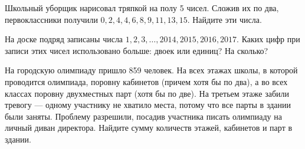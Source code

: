 ﻿
\begin{enumerate}

\itA Школьный уборщик нарисовал тряпкой на полу 5 чисел. Сложив их по два, первоклассники получили $0, 2, 4, 4, 6, 8, 9, 11, 13, 15$. Найдите эти числа.

\itB На доске подряд записаны числа $1,2,3,\dots, 2014, 2015, 2016, 2017.$ Каких цифр при записи этих чисел использовано больше: двоек или единиц? На сколько?

\itC На городскую олимпиаду пришло 859 человек. На всех этажах школы, в которой проводится олимпиада, поровну кабинетов (причем хотя бы по два), а во всех классах поровну двухместных парт (хотя бы по две). На третьем этаже забили тревогу — одному участнику не хватило места, потому что все парты в здании были заняты. Проблему разрешили, посадив участника писать олимпиаду на личный диван директора. Найдите сумму количеств этажей, кабинетов и парт в здании.
\end{enumerate}